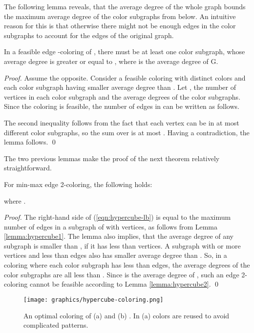 \documentclass[runningheads, a4paper]{llncs}
\begin{document}
The following lemma reveals, that the average degree of the whole graph bounds the maximum average degree of the color subgraphs from below. An intuitive reason for this is that otherwise there might not be enough edges in the color subgraphs to account for the edges of the original graph.

\begin{lemma}\label{lemma:hypercube2}
In a feasible edge -coloring of , there must be at least one color subgraph, whose average degree is greater or equal to , where  is the average degree of G.
\end{lemma}
\begin{proof}
Assume the opposite. Consider a feasible coloring with  distinct colors and each color subgraph having smaller average degree than . Let ,  the number of vertices in each color subgraph and  the average degrees of the color subgraphs. Since the coloring is feasible, the number of edges in  can be written as follows.

The second inequality follows from the fact that each vertex can be in at most  different color subgraphs, so the sum over  is at most . Having a contradiction, the lemma follows. \qed
\end{proof}

The two previous lemmas make the proof of the next theorem relatively straightforward.

\begin{theorem}\label{theorem:hypercube}
For min-max edge 2-coloring, the following holds:

where .
\end{theorem}
\begin{proof}
The right-hand side of (\ref{eqn:hypercube-lb}) is equal to the maximum number of edges in a subgraph of  with  vertices, as follows from Lemma \ref{lemma:hypercube1}. The lemma also implies, that the average degree of any subgraph is smaller than , if it has less than  vertices. A subgraph with  or more vertices and less than  edges also has smaller average degree than . So, in a coloring where each color subgraph has less than  edges, the average degrees of the color subgraphs are all less than . Since  is the average degree of , such an edge 2-coloring cannot be feasible according to Lemma \ref{lemma:hypercube2}. \qed
\end{proof}

\begin{figure}[htb]
\centering \texttt{[image: graphics/hypercube-coloring.png]}
\caption{An optimal coloring of (a)  and (b) . In (a) colors are reused to avoid complicated patterns.}\label{img:hypercube-coloring}
\end{figure}
\end{document}
